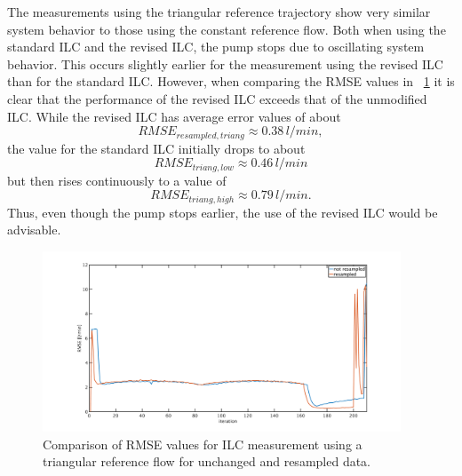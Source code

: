 The measurements using the triangular reference trajectory show very similar system behavior to those using the constant reference flow.
Both when using the standard ILC and the revised ILC, the pump stops due to oscillating system behavior. This occurs slightly earlier for the measurement using the revised ILC than for the standard ILC. However, when comparing the RMSE values in \figurename~\ref{fig:RMSE_ilc_var_dist_comp_triang} it is clear that the performance of the revised ILC exceeds that of the unmodified ILC. While the revised ILC has average error values of about
\begin{equation}
  RMSE_{resampled,triang}\approx0.38\,l/min,
\end{equation}
the value for the standard ILC initially drops to about
\begin{equation}
  RMSE_{triang,low}\approx0.46\,l/min
\end{equation}
but then rises continuously to a value of
\begin{equation}
  RMSE_{triang,high}\approx0.79\,l/min.
\end{equation}
Thus, even though the pump stops earlier, the use of the revised ILC would be advisable.

\begin{figure}[ht!]
  \centering
  \includegraphics[width=0.95\textwidth]{images/chapt_5/ILC/RMSE_ilc_var_dist_comp_triang.pdf}
  \caption[Comparison of RMSE values for ILC measurement using a triangular reference flow for unchanged and resampled data]{Comparison of RMSE values for ILC measurement using a triangular reference flow for unchanged and resampled data.}
  \label{fig:RMSE_ilc_var_dist_comp_triang}
\end{figure}


